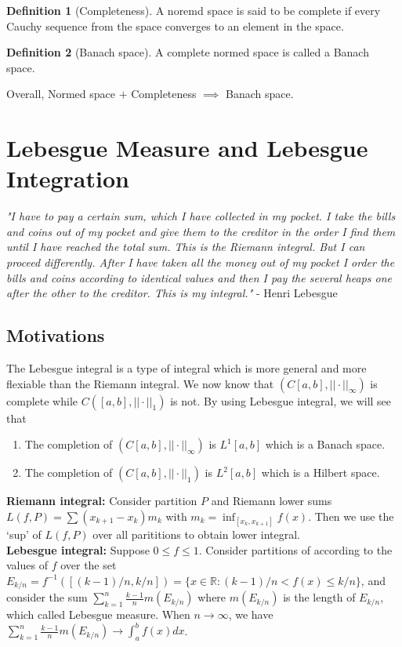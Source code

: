 \documentclass{article}
\theoremstyle{definition}
\newtheorem{definition}{Definition}[section]
\begin{document}
\begin{definition}[Completeness]
A noremd space is said to be complete if every Cauchy sequence from the space converges to an element in the space.
\end{definition}

\begin{definition}[Banach space]
A complete normed space is called a Banach space.

\end{definition}

Overall, Normed space $+$ Completeness $\implies$ Banach space.


\section{Lebesgue Measure and Lebesgue Integration}


\textit{"I have to pay a certain sum, which I have collected in my pocket. I take the bills and coins out of my pocket and give them to the creditor in the order I find them until I have reached the total sum. This is the Riemann integral. But I can proceed differently. After I have taken all the money out of my pocket I order the bills and coins according to identical values and then I pay the several heaps one after the other to the creditor. This is my integral."} - Henri Lebesgue \\

\subsection{Motivations}
The Lebesgue integral is a type of integral which is more general and more flexiable than the Riemann integral. We now know that $(C[a,b], ||\cdot||_{\infty})$ is complete while $C([a,b],||\cdot||_1)$ is not. By using Lebesgue integral, we will see that 
\begin{enumerate}
	\item The completion of $(C[a,b], ||\cdot||_{\infty})$ is $L^1[a,b]$ which is a Banach space.
	\item The completion of $(C[a,b],||\cdot||_1)$ is $L^2[a,b]$ which is a Hilbert space. 
\end{enumerate}


\noindent \textbf{Riemann integral:} Consider partition $P$ and Riemann lower sums $L(f,P)=\sum (x_{k+1}-x_k)m_k$ with $m_k=\inf_{[x_k,x_{k+1}]}f(x)$. Then we use the `sup' of $L(f,P)$ over all parititions to obtain lower integral. \\
\textbf{Lebesgue integral:} Suppose $0\leq f \leq 1$. Consider partitions of according to the values of $f$ over the set $E_{k/n}=f^{-1}([(k-1)/n,k/n])=\{x\in \mathbb{R}:(k-1)/n<f(x)\leq k/n\}$, and consider the sum $\sum_{k=1}^n \frac{k-1}{n} m(E_{k/n})$ where $m(E_{k/n})$ is the length of $E_{k/n}$, which called Lebesgue measure. When $n\to \infty$, we have $\sum_{k=1}^n \frac{k-1}{n} m(E_{k/n})\to \int_a^bf(x)dx$.
\end{document}
